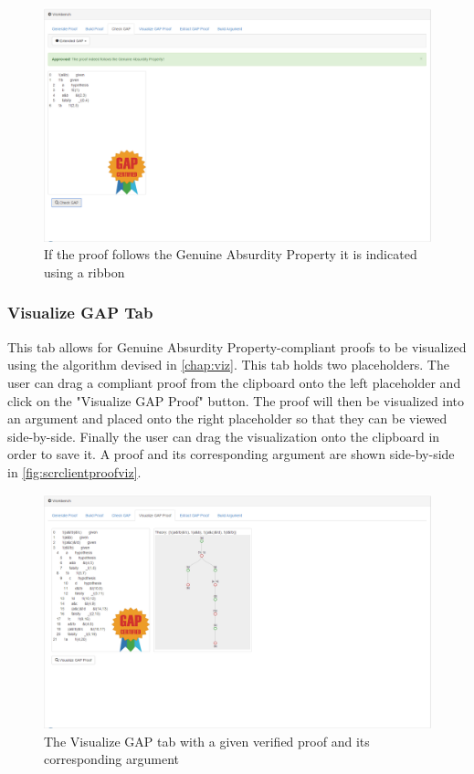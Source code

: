 \documentclass[11pt,twoside,a4paper]{report}
\begin{document}
\begin{figure}[htp]
\centerline{\includegraphics[scale=0.3]{img/scr-client-checkgap.png}}
\caption{If the proof follows the Genuine Absurdity Property it is indicated using a ribbon\label{fig:scrclientcheckgap}}
\end{figure}

\subsubsection{Visualize GAP Tab}
This tab allows for Genuine Absurdity Property-compliant proofs to be visualized using the algorithm devised in \autoref{chap:viz}. This tab holds two placeholders. The user can drag a compliant proof from the clipboard onto the left placeholder and click on the "Visualize GAP Proof" button. The proof will then be visualized into an argument and placed onto the right placeholder so that they can be viewed side-by-side. Finally the user can drag the visualization onto the clipboard in order to save it. A proof and its corresponding argument are shown side-by-side in \autoref{fig:scrclientproofviz}.

\begin{figure}[htp]
\centerline{\includegraphics[scale=0.3]{img/scr-client-proofviz.png}}
\caption{The Visualize GAP tab with a given verified proof and its corresponding argument\label{fig:scrclientproofviz}}
\end{figure}
\end{document}
